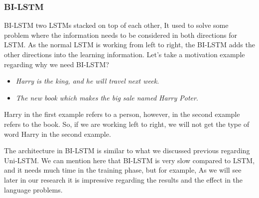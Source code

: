 
\subsubsection{BI-LSTM}\label{sec_bi-lstm}

BI-LSTM two LSTMs stacked on top of each other, It used to solve some problem where the information needs to be considered in both directions for LSTM. As the normal LSTM is working from left to right, the BI-LSTM adds the other directions into the learning information. Let's take a motivation example regarding why we need BI-LSTM?
\begin{itemize}
\item \textit{Harry is the king, and he will travel next week.}
\item \textit{The new book which makes the big sale named Harry Poter}.
\end{itemize}
Harry in the first example refers to a person, however, in the second example refers to the book. So, if we are working left to right, we will not get the type of word Harry in the second example.

The architecture in BI-LSTM is similar to what we discussed previous regarding Uni-LSTM. We can mention here that BI-LSTM is very slow compared to LSTM, and it needs much time in the training phase, but for example, As we will see later in our research it is impressive regarding the results and the effect in the language problems.
